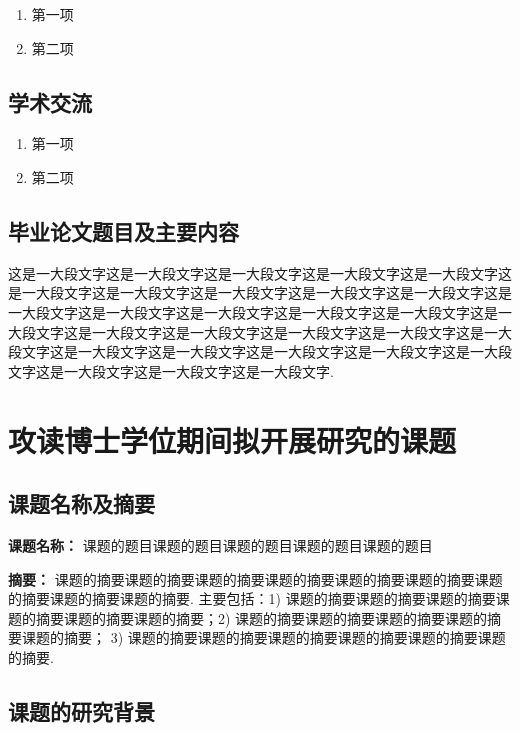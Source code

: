 \documentclass{phdproposal}
\begin{document}
\begin{enumerate}[label=(\arabic*)]
	\item 第一项
	\item 第二项
\end{enumerate}

\section{学术交流}

\begin{enumerate}[label=(\arabic*)]
	\item 第一项
	\item 第二项
\end{enumerate}

\section{毕业论文题目及主要内容}

这是一大段文字这是一大段文字这是一大段文字这是一大段文字这是一大段文字这是一大段文字这是一大段文字这是一大段文字这是一大段文字这是一大段文字这是一大段文字这是一大段文字这是一大段文字这是一大段文字这是一大段文字这是一大段文字这是一大段文字这是一大段文字这是一大段文字这是一大段文字这是一大段文字这是一大段文字这是一大段文字这是一大段文字这是一大段文字这是一大段文字这是一大段文字这是一大段文字这是一大段文字.





\chapter{攻读博士学位期间拟开展研究的课题}

\section{课题名称及摘要}

\textbf{课题名称：} 课题的题目课题的题目课题的题目课题的题目课题的题目

\textbf{摘要：} 课题的摘要课题的摘要课题的摘要课题的摘要课题的摘要课题的摘要课题的摘要课题的摘要课题的摘要.
主要包括：1) 课题的摘要课题的摘要课题的摘要课题的摘要课题的摘要课题的摘要；2) 课题的摘要课题的摘要课题的摘要课题的摘要课题的摘要； 3) 课题的摘要课题的摘要课题的摘要课题的摘要课题的摘要课题的摘要.

\section{课题的研究背景}
\end{document}
